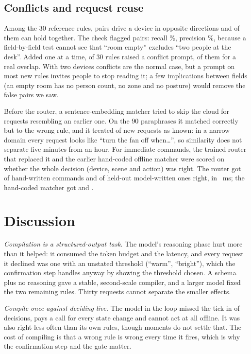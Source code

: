 \documentclass[conference]{IEEEtran}
\begin{document}
\subsection{Conflicts and request reuse}\label{sec:reuse}
Among the 30 reference rules, \cfPairs{} pairs drive a device in opposite
directions and \cfReal{} of them can hold together. The check flagged
\cfFlagged{} pairs: recall \cfRecall\%, precision \cfPrecision\%, because a
field-by-field test cannot see that ``room empty'' excludes ``two people at the
desk''. Added one at a time, \cfPrompts{} of 30 rules raised a conflict prompt,
\cfPromptsReal{} of them for a real overlap. With two devices conflicts are the
normal case, but a prompt on most new rules invites people to stop reading
it; a few implications between fields (an empty room has no person count, no
zone and no posture) would remove the false pairs we saw.

Before the router, a sentence-embedding matcher tried to skip the cloud for
requests resembling an earlier one. On the 90 paraphrases it matched
\mEmbCorrect{} correctly but \mEmbWrong{} to the wrong rule, and it treated
\mEmbNovel{} of \mEmbNovelN{} new requests as known: in a narrow domain every
request looks like ``turn the fan off when\ldots'', so similarity does not
separate five minutes from an hour. For immediate commands, the trained
router that replaced it and the earlier hand-coded offline matcher were scored
on whether the whole decision (device, scene and action) was right. The router
got \rtHand{} of \rtHandN{} hand-written commands and \rtHeld{} of \rtHeldN{}
held-out model-written ones right, in \rtHandMs~ms; the hand-coded matcher got
\rtLitHand{} and \rtLitHeld.

\section{Discussion}\label{sec:discussion}
\textit{Compilation is a structured-output task.} The model's reasoning phase
hurt more than it helped: it consumed the token budget and the latency, and
every request it declined was one with an unstated threshold (``warm'',
``bright''), which the confirmation step handles anyway by showing the
threshold chosen. A schema plus no reasoning gave a stable,
second-scale compiler, and a larger model fixed the two remaining rules. Thirty requests cannot separate the smaller effects.

\textit{Compile once against deciding live.} The model in the loop missed
the tick in \blSlow{} of \blN{} decisions, pays a call for every state change
and cannot act at all offline. It was also right less often than its own
rules, though \blN{} moments do not settle that. The cost of compiling is that a wrong rule is wrong
every time it fires, which is why the confirmation step and the gate matter.
\end{document}
